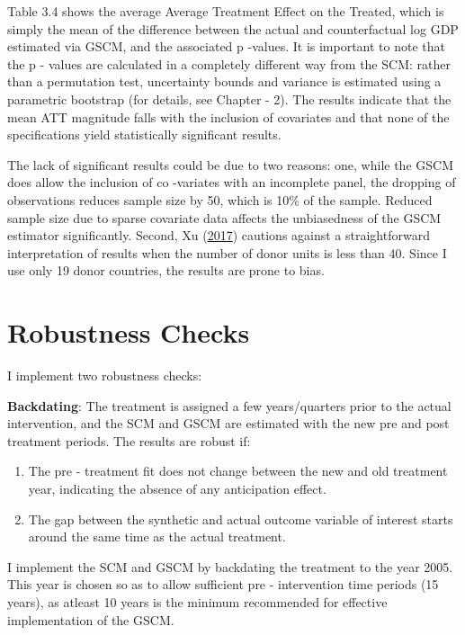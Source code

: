 \documentclass[12pt,nobind, a4paper]{reedthesis}
\begin{document}
 Table 3.4 shows the average Average Treatment Effect on the Treated, which is simply the mean of the difference between the actual and counterfactual log GDP estimated via GSCM, and the associated p -values. It is important to note that the p - values are calculated in a completely different way from the SCM: rather than a permutation test, uncertainty bounds and variance is estimated using a parametric bootstrap (for details, see Chapter - 2). The results indicate that the mean ATT magnitude falls with the inclusion of covariates and that none of the specifications yield statistically significant results.
 \linebreak

 The lack of significant results could be due to two reasons: one, while the GSCM does allow the inclusion of co -variates with an incomplete panel, the dropping of observations reduces sample size by 50, which is 10\% of the sample. Reduced sample size due to sparse covariate data affects the unbiasedness of the GSCM estimator significantly. Second, Xu (\protect\hyperlink{ref-xu_generalized_2017}{2017}) cautions against a straightforward interpretation of results when the number of donor units is less than 40. Since I use only 19 donor countries, the results are prone to bias.

 \hypertarget{robustness-checks}{%
 \section{Robustness Checks}\label{robustness-checks}}

 I implement two robustness checks:

 \textbf{Backdating}: The treatment is assigned a few years/quarters prior to the actual intervention, and the SCM and GSCM are estimated with the new pre and post treatment periods. The results are robust if:
 \begin{enumerate}
 \def\labelenumi{\alph{enumi}.}
 \item
   The pre - treatment fit does not change between the new and old treatment year, indicating the absence of any anticipation effect.
 \item
   The gap between the synthetic and actual outcome variable of interest starts around the same time as the actual treatment.
   \linebreak
 \end{enumerate}
 I implement the SCM and GSCM by backdating the treatment to the year 2005. This year is chosen so as to allow sufficient pre - intervention time periods (15 years), as atleast 10 years is the minimum recommended for effective implementation of the GSCM.
\end{document}
